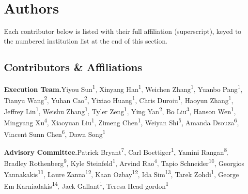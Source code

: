 \section{Authors}
\label{app:authors}
Each contributor below is listed with their full affiliation (superscript), keyed to the numbered institution list at the end of this section.

\subsection{Contributors \& Affiliations}

\noindent\textbf{Execution Team.}\quad Yiyou Sun\textsuperscript{1}, Xinyang Han\textsuperscript{1}, Weichen Zhang\textsuperscript{1}, Yuanbo Pang\textsuperscript{1}, Tianyu Wang\textsuperscript{2}, Yuhan Cao\textsuperscript{2}, Yixiao Huang\textsuperscript{1}, Chris Duroiu\textsuperscript{1}, Haoyun Zhang\textsuperscript{1}, Jeffrey Lin\textsuperscript{1}, Weishu Zhang\textsuperscript{1}, Tyler Zeng\textsuperscript{1}, Ying Yan\textsuperscript{2}, Bo Liu\textsuperscript{3}, Hanson Wen\textsuperscript{1}, Mingyang Xu\textsuperscript{4}, Xiaoyuan Liu\textsuperscript{1}, Zimeng Chen\textsuperscript{1}, Weiyan Shi\textsuperscript{5}, Amanda Dsouza\textsuperscript{6}, Vincent Sunn Chen\textsuperscript{6}, Dawn Song\textsuperscript{1}\par
\vspace{4pt}

\noindent\textbf{Advisory Committee.}\quad Patrick Bryant\textsuperscript{7}, Carl Boettiger\textsuperscript{1}, Yamini Rangan\textsuperscript{8}, Bradley Rothenberg\textsuperscript{9}, Kyle Steinfeld\textsuperscript{1}, Arvind Rao\textsuperscript{4}, Tapio Schneider\textsuperscript{10}, Georgios Yannakakis\textsuperscript{11}, Laure Zanna\textsuperscript{12}, Kaan Ozbay\textsuperscript{12}, Ida Sim\textsuperscript{13}, Tarek Zohdi\textsuperscript{1}, George Em Karniadakis\textsuperscript{14}, Jack Gallant\textsuperscript{1}, Teresa Head-gordon\textsuperscript{1}\par
\vspace{4pt}

